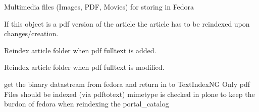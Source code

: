\documentclass[a4paper,10pt,ngerman]{sphinxmanual}
\begin{document}

\begin{fulllineitems}
\label{contenttypen:Products.DiPP.content.fedoramultimedia.FedoraMultimedia}
Multimedia files (Images, PDF, Movies) for storing in Fedora

\begin{fulllineitems}
\label{contenttypen:Products.DiPP.content.fedoramultimedia.FedoraMultimedia.reindex_article}
If this object is a pdf version of the article the article has to be
reindexed upon changes/creation.

\end{fulllineitems}


\begin{fulllineitems}
\label{contenttypen:Products.DiPP.content.fedoramultimedia.FedoraMultimedia.at_post_create_script}
Reindex article folder when pdf fulltext is added.

\end{fulllineitems}


\begin{fulllineitems}
\label{contenttypen:Products.DiPP.content.fedoramultimedia.FedoraMultimedia.at_post_edit_script}
Reindex article folder when pdf fulltext is modified.

\end{fulllineitems}


\begin{fulllineitems}
\label{contenttypen:Products.DiPP.content.fedoramultimedia.FedoraMultimedia.indexableContent}
get the binary datastream from fedora and return in to TextIndexNG
Only pdf Files should be indexed (via pdftotext) mimetype is checked in plone
to keep the burdon of fedora when reindexing the portal\_catalog


\end{fulllineitems}
\end{fulllineitems}
\end{document}

